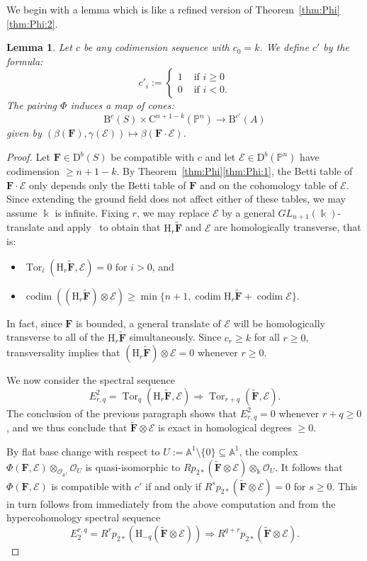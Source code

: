 \documentclass[12pt]{amsart}
\newtheorem{lemma}{Lemma}[section]
\theoremstyle{definition}
\theoremstyle{remark}
\newcommand{\Tor}{\operatorname{Tor}}
\newcommand{\kk}{\Bbbk}
\newcommand{\codim}{\operatorname{codim}}
\newcommand{\PP}{\mathbb{P}}
\renewcommand{\AA}{\mathbb{A}}
\newcommand{\HH}{\mathrm{H}}
\newcommand{\cc}{c}
\newcommand{\cO}{\mathcal{O}}
\newcommand{\cE}{\mathcal{E}}
\newcommand{\FF}{\mathbf{F}}
\newcommand{\GL}{{GL}}
\newcommand{\DD}{\mathrm{D}}
\newcommand{\CQ}{\mathrm{C}}
\newcommand{\BBQ}{\mathrm{B}}
\begin{document}
We begin with a lemma which is like a refined version of Theorem~\ref{thm:Phi}\eqref{thm:Phi:2}.  

\begin{lemma}\label{lem:refined positivity}
Let $\cc$ be any codimension sequence with $\cc_0=k$.   We define $\cc'$ by the formula:
\[
\cc'_i:=\begin{cases}
1&\text{ if } i\geq 0\\%
0&\text{ if } i<0. %
\end{cases}
\]
The  pairing $\Phi$ induces a map of cones:
\[
\BBQ^{\cc}(S)\times \CQ^{n+1-k}(\PP^n)\to \BBQ^{\cc'}(A)
\]
given by $(\beta(\FF), \gamma(\cE))\mapsto \beta(\FF\cdot \cE)$.
\end{lemma}
\begin{proof}
Let $\FF\in \DD^b(S)$ be compatible with $\cc$ and let $\cE\in \DD^{b}(\PP^n)$ have codimension $\geq n+1-k$.  By Theorem~\ref{thm:Phi}\eqref{thm:Phi:1}, the Betti table of $\FF\cdot \cE$ only depends only the Betti table of $\FF$ and on the cohomology table of $\cE$.  Since extending the ground field does not affect either of these tables, we may assume $\kk$ is infinite.  Fixing $r$, we may replace $\cE$ by a general $\GL_{n+1}(\kk)$-translate and apply~\cite[Theorem, p.\ 335]{miller-speyer} to obtain that $\HH_r \widetilde{\FF}$ and $\cE$ are homologically transverse, that is:
\begin{itemize}
	\item $\Tor_i(\HH_r\widetilde{\FF},\cE)=0 \text{ for } i>0$, and
	\item $\codim ((\HH_r\widetilde{\FF})\otimes \cE) \geq \min\{n+1, \codim \HH_r\widetilde{\FF}+\codim \cE\}.$
\end{itemize}
In fact, since $\FF$ is bounded, a general translate of $\cE$ will be homologically transverse to all of the $\HH_r\widetilde{\FF}$ simultaneously.  
Since $c_r\geq k$ for all $r\geq 0$, transversality implies that $(\HH_r\widetilde{\FF})\otimes \cE=0$ whenever $r\geq 0$.


We now consider the spectral sequence
\[
E^2_{r,q}=\Tor_q(\HH_r\widetilde{\FF},\cE)\Rightarrow \Tor_{r+q}(\widetilde{\FF},\cE).
\]
The conclusion of the previous paragraph shows that $E^2_{r,q}=0$ whenever $r+q\geq 0$, and we thus conclude that 
$\widetilde{\FF}\otimes \cE$ is exact in homological degrees $\geq 0$.

By flat base change with respect to $U:=\AA^1\setminus \{0\} \subseteq \AA^1$, the complex $\Phi(\FF,\cE)\otimes_{\cO_{\AA^1}} \cO_{U}$ is quasi-isomorphic to $Rp_{2*}\left(\widetilde{\FF}\otimes \cE\right)\otimes_{\kk} \cO_{U}$.  It follows that $\Phi(\FF,\cE)$ is compatible with $\cc'$ if and only if $R^sp_{2*}\left(\widetilde{\FF}\otimes \cE\right)=0$ for $s\geq 0$.  This in turn follows from immediately from the above computation and from the hypercohomology spectral sequence
\[
E_2^{r,q}=R^{r}p_{2*}(\HH_{-q}(\widetilde{\FF}\otimes \cE))\Rightarrow R^{q+r}p_{2*}(\widetilde{\FF}\otimes \cE).
\]
\end{proof}
\end{document}
